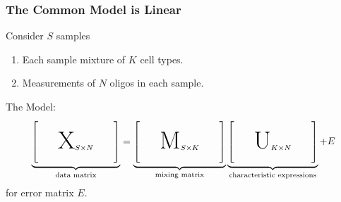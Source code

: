 \documentclass{beamer}
\begin{document}
\begin{frame}
  \frametitle{The Common Model is Linear}
  Consider {\color{blue}$S$} samples
  \begin{enumerate}
  \item Each sample mixture of {\color{blue}$K$} cell types.
  \item Measurements of {\color{blue}$N$} oligos in each sample. 
  \end{enumerate}

  \vspace{.25cm}
  The Model:
  \[
  \underbrace{\begin{bmatrix}
    \quad& & \quad\\
    \quad& \text{{\Huge X}}_{S\times N}& \\
    \quad& & \quad
    \end{bmatrix}}_{
      \text{data matrix}
  }
  =
    \underbrace{\begin{bmatrix}
    \quad& & \quad\\
    \quad& \text{{\Huge M}}_{S\times K}& \\
    \quad& & \quad
    \end{bmatrix}}_{
      \text{mixing matrix}
  }
  \underbrace{\begin{bmatrix}
    \quad& & \quad\\
    \quad& \text{{\Huge U}}_{K\times N}& \\
    \quad& & \quad
    \end{bmatrix}}_{
      \text{characteristic expressions}
  }
  +
  E
  \]
  for error matrix $E$.
\end{frame}
\end{document}
